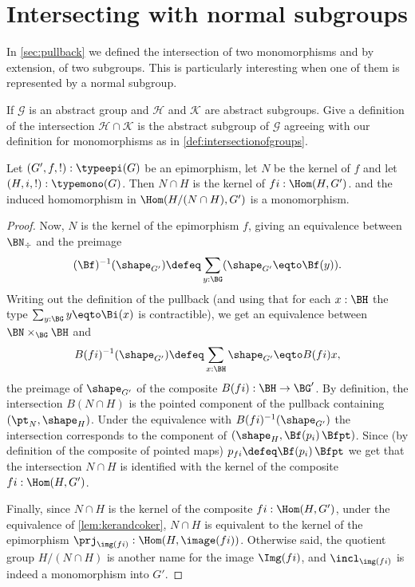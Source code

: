 \section{Intersecting with normal subgroups}
In \cref{sec:pullback} we defined the intersection of two monomorphisms and by extension, of two subgroups.  This is particularly interesting when one of them is represented by a normal subgroup.
\begin{xca}
  If $\mathcal G$ is an abstract group and $\mathcal H$ and $\mathcal K$ are abstract subgroups.  Give a definition of the intersection $\mathcal H\cap\mathcal K$ is the abstract subgroup of $\mathcal G$ agreeing with our definition for monomorphisms as in \cref{def:intersectionofgroups}.
\end{xca}
\begin{lemma}
  \label{lem:whatSylow2needs}
  Let $(G',f,!):\typeepi(G)$ be an epimorphism, let $N$ be the kernel of $f$  and let $(H,i,!):\typemono(G)$.
  Then
$N\cap H$ is the kernel of $fi:\Hom(H,G')$. 
and the induced homomorphism in $\Hom(H/(N\cap H),G')$ is a monomorphism.
  \begin{proof}
Now, $N$ is the kernel of the epimorphism $f$, giving an equivalence between $\BN_\div$ and the preimage
$$(\Bf)^{-1}(\sh_{G'})\defeq\sum_{y:\BG}(\sh_{G'}\eqto \Bf(y)).$$
Writing out the definition of the pullback (and using that for each $x:\BH$ the type $\sum_{y:\BG}y\eqto \Bi(x)$ is contractible), we get an equivalence between $\BN\times_{\BG}\BH$ and
$$B(fi)^{-1}(\sh_{G'})\defeq\sum_{x:\BH}\sh_{G'}\eqto B(fi)x,$$
the preimage of $\sh_{G'}$ of the composite $B(fi):\BH\to \BG'$.
 By definition, the intersection $B(N\cap H)$ is the pointed component of the pullback containing $(\pt_N,\sh_H)$.  Under the equivalence with $B(fi)^{-1}(\sh_{G'})$ the intersection corresponds to the component of $(\sh_H,\Bf(p_i)\,\Bfpt)%
 $.
Since (by definition of the composite of pointed maps) $p_{fi}\defeq \Bf(p_i)\,\Bfpt$ we get that the intersection $N\cap H$ is identified with the kernel of the composite $fi:\Hom(H,G')$.

Finally, since $N\cap H$ is the kernel of the composite $fi:\Hom(H,G')$, under the equivalence of \cref{lem:kerandcoker}, $N\cap H$ is equivalent to the kernel of the epimorphism $\prj_{\img(fi)}:\Hom(H,\image (fi))$.  Otherwise said, the quotient group $H/(N\cap H)$ is another name for the image $\Img (fi)$, and $\incl_{\img(fi)}$ is indeed a monomorphism into $G'$.
  \end{proof}
\end{lemma}
